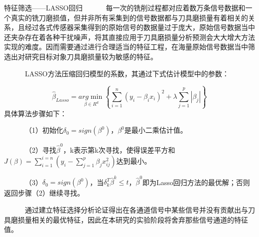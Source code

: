 % 
% 
\begin{frame}{特征筛选——LASSO回归}
\ \ \ \ \ \ 每一次的铣削过程都对应着数万条信号数据和一个真实的铣刀磨损值，但并非所有采集到的信号数据都与刀具磨损量有着相关的关系，且经过各式传感器采集得到的原始信号的数据量过于庞大，原始信号数据当中还夹杂存在着各种干扰噪声，将其直接应用于刀具磨损量分析预测会大大增大方法实现的难度。因而需要通过进行合理适当的特征工程，在海量原始信号数据当中筛选出对研究目标对象刀具磨损量较为敏感的特征。\par
\ \ \ \ \ \ LASSO方法压缩回归模型的系数，其通过下式估计模型中的参数： \par
$$ \hat{\beta}_{Lasso}=\underset{\beta \in R^d}{arg\min}\left\{ \left. \sum_{i=1}^n{\left( y_i-\beta _ix_i \right) ^2+\lambda \sum_{j=1}^p{\left| \beta _j \right|}} \right\} \right.  $$
具体算法步骤如下：\par
\ \ \ \ \ \ （1）初始化$\delta _0 = sign\left( \beta ^0 \right)$，$\beta ^0$是最小二乘估计值。\par
\ \ \ \ \ \ （2）寻找$\hat{\beta}^{0}$，k表示第k次寻找，使得误差平方和$J\left( \beta \right)=\sum_{i=1}^{i=n}{\left( y_i-\sum_{j=1}^p{\beta _jx_{ij}^2} \right)}$达到最小。\par
\ \ \ \ \ \ （3）$\delta _0=sign\left( \beta ^0 \right) $，当$\delta _{k}^{T}\hat{\beta}^k \le t$，$\hat{\beta}^{0}$即为Lasso回归方法的最优解；否则返回步骤（2）继续寻找。\par
% 
\ \ \ \ \ \ 通过建立特征选择分析论证得出在各通道信号中某些信号并没有贡献出与刀具磨损量相关的最优特征，因此在本研究的实验阶段将舍弃那些信号通道的特征值。 \par
\end{frame}

